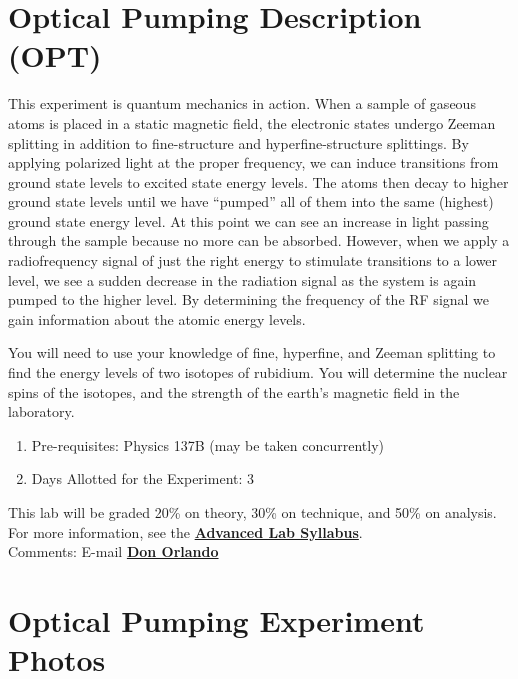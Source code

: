 \documentclass{../lab}
\begin{document}
\maketitle

\tableofcontents

\section{Optical Pumping Description (OPT)}

\newpage

This experiment is quantum mechanics in action. When a sample of gaseous atoms is placed in a static magnetic field, the electronic states undergo Zeeman splitting in addition to fine-structure and hyperfine-structure splittings. By applying polarized light at the proper frequency, we can induce transitions from ground state levels to excited state energy levels. The atoms then decay to higher ground state levels until we have ``pumped'' all of them into the same (highest) ground state energy level. At this point we can see an increase in light passing through the sample because no more can be absorbed. However, when we apply a radiofrequency signal of just the right energy to stimulate transitions to a lower level, we see a sudden decrease in the radiation signal as the system is again pumped to the higher level. By determining the frequency of the RF signal we gain information about the atomic energy levels.

You will need to use your knowledge of fine, hyperfine, and Zeeman splitting to find the energy levels of two isotopes of rubidium. You will determine the nuclear spins of the isotopes, and the strength of the earth's magnetic field in the laboratory.
\begin{enumerate}
    \item Pre-requisites: Physics 137B (may be taken concurrently)

    \item Days Allotted for the Experiment: 3

\end{enumerate}

This lab will be graded 20\% on theory, 30\% on technique, and 50\% on analysis. For more information, see the \href{\AdvancedLabSyllabus}{\textbf{Advanced Lab Syllabus}}. \\

Comments: E-mail \href{\MailDonOrlando}{\textbf{Don Orlando}}

\section{Optical Pumping Experiment Photos}
\end{document}
